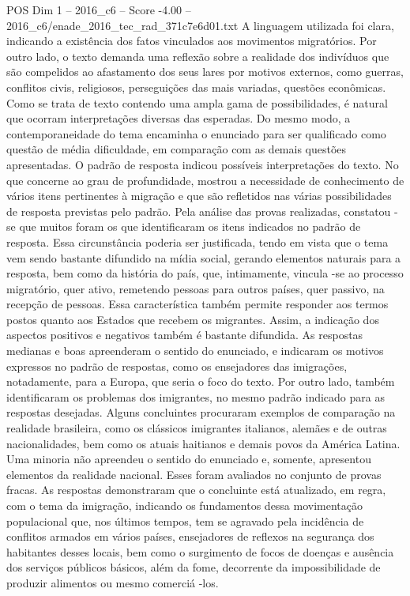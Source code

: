 \begin{textsample}{POS Dim 1 – 2016\_c6 – Score -4.00 – 2016\_c6/enade\_2016\_tec\_rad\_371c7e6d01.txt}
A linguagem utilizada foi clara, indicando a existência dos fatos vinculados aos movimentos migratórios.
Por outro lado, o texto demanda uma reflexão sobre a realidade dos indivíduos que são compelidos ao afastamento dos seus lares por motivos externos, como guerras, conflitos civis, religiosos, perseguições das mais variadas, questões econômicas.
Como se trata de texto contendo uma ampla gama de possibilidades, é natural que ocorram interpretações diversas das esperadas.
Do mesmo modo, a contemporaneidade do tema encaminha o enunciado para ser qualificado como questão de média dificuldade, em comparação com as demais questões apresentadas.
O padrão de resposta indicou possíveis interpretações do texto.
No que concerne ao grau de profundidade, mostrou a necessidade de conhecimento de vários itens pertinentes à migração e que são refletidos nas várias possibilidades de resposta previstas pelo padrão.
Pela análise das provas realizadas, constatou -se que muitos foram os que identificaram os itens indicados no padrão de resposta.
Essa circunstância poderia ser justificada, tendo em vista que o tema vem sendo bastante difundido na mídia social, gerando elementos naturais para a resposta, bem como da história do país, que, intimamente, vincula -se ao processo migratório, quer ativo, remetendo pessoas para outros países, quer passivo, na recepção de pessoas.
Essa característica também permite responder aos termos postos quanto aos Estados que recebem os migrantes.
Assim, a indicação dos aspectos positivos e negativos também é bastante difundida.
As respostas medianas e boas apreenderam o sentido do enunciado, e indicaram os motivos expressos no padrão de respostas, como os ensejadores das imigrações, notadamente, para a Europa, que seria o foco do texto.
Por outro lado, também identificaram os problemas dos imigrantes, no mesmo padrão indicado para as respostas desejadas.
Alguns concluintes procuraram exemplos de comparação na realidade brasileira, como os clássicos imigrantes italianos, alemães e de outras nacionalidades, bem como os atuais haitianos e demais povos da América Latina.
Uma minoria não apreendeu o sentido do enunciado e, somente, apresentou elementos da realidade nacional.
Esses foram avaliados no conjunto de provas fracas.
As respostas demonstraram que o concluinte está atualizado, em regra, com o tema da imigração, indicando os fundamentos dessa movimentação populacional que, nos últimos tempos, tem se agravado pela incidência de conflitos armados em vários países, ensejadores de reflexos na segurança dos habitantes desses locais, bem como o surgimento de focos de doenças e ausência dos serviços públicos básicos, além da fome, decorrente da impossibilidade de produzir alimentos ou mesmo comerciá -los.

\end{textsample}
